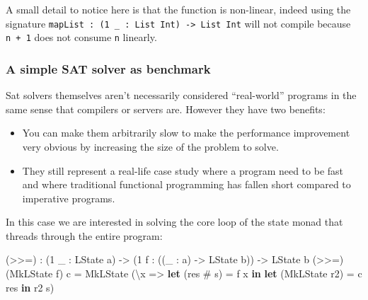 \documentclass[
]{article}
\newenvironment{Shaded}{}{}
\newcommand{\DataTypeTok}[1]{\textcolor[rgb]{0.56,0.13,0.00}{#1}}
\newcommand{\DecValTok}[1]{\textcolor[rgb]{0.25,0.63,0.44}{#1}}
\newcommand{\KeywordTok}[1]{\textcolor[rgb]{0.00,0.44,0.13}{\textbf{#1}}}
\newcommand{\NormalTok}[1]{#1}
\newcommand{\OperatorTok}[1]{\textcolor[rgb]{0.40,0.40,0.40}{#1}}
\newcommand{\OtherTok}[1]{\textcolor[rgb]{0.00,0.44,0.13}{#1}}
\providecommand{\tightlist}{%
  \setlength{\itemsep}{0pt}\setlength{\parskip}{0pt}}
\begin{document}
A small detail to notice here is that the function is non-linear, indeed
using the signature
\texttt{mapList\ :\ (1\ \_\ :\ List\ Int)\ -\textgreater{}\ List\ Int}
will not compile because \texttt{n\ +\ 1} does not consume \texttt{n}
linearly.

\hypertarget{a-simple-sat-solver-as-benchmark}{%
\subsubsection{A simple SAT solver as
benchmark}\label{a-simple-sat-solver-as-benchmark}}

Sat solvers themselves aren't necessarily considered ``real-world''
programs in the same sense that compilers or servers are. However they
have two benefits:

\begin{itemize}
\tightlist
\item
  You can make them arbitrarily slow to make the performance improvement
  very obvious by increasing the size of the problem to solve.
\item
  They still represent a real-life case study where a program need to be
  fast and where traditional functional programming has fallen short
  compared to imperative programs.
\end{itemize}

In this case we are interested in solving the core loop of the state
monad that threads through the entire program:

\begin{Shaded}
\begin{Highlighting}[]
\NormalTok{(}\OperatorTok{\textgreater{}\textgreater{}=}\NormalTok{) }\OperatorTok{:}\NormalTok{ (}\DecValTok{1}\NormalTok{ \_ }\OperatorTok{:} \DataTypeTok{LState}\NormalTok{ a) }\OtherTok{{-}\textgreater{}}\NormalTok{ (}\DecValTok{1}\NormalTok{ f }\OperatorTok{:}\NormalTok{ ((\_ }\OperatorTok{:}\NormalTok{ a) }\OtherTok{{-}\textgreater{}} \DataTypeTok{LState}\NormalTok{ b))}
     \OtherTok{{-}\textgreater{}} \DataTypeTok{LState}\NormalTok{ b}
\NormalTok{(}\OperatorTok{\textgreater{}\textgreater{}=}\NormalTok{) (}\DataTypeTok{MkLState}\NormalTok{ f) c }\OtherTok{=} \DataTypeTok{MkLState} 
\NormalTok{    (\textbackslash{}x }\OtherTok{=\textgreater{}} \KeywordTok{let}\NormalTok{ (res }\OperatorTok{\#}\NormalTok{ s\textquotesingle{}) }\OtherTok{=}\NormalTok{ f x }\KeywordTok{in}
           \KeywordTok{let}\NormalTok{ (}\DataTypeTok{MkLState}\NormalTok{ r2) }\OtherTok{=}\NormalTok{ c res }\KeywordTok{in} 
\NormalTok{           r2 s\textquotesingle{})}
\end{Highlighting}
\end{Shaded}
\end{document}
